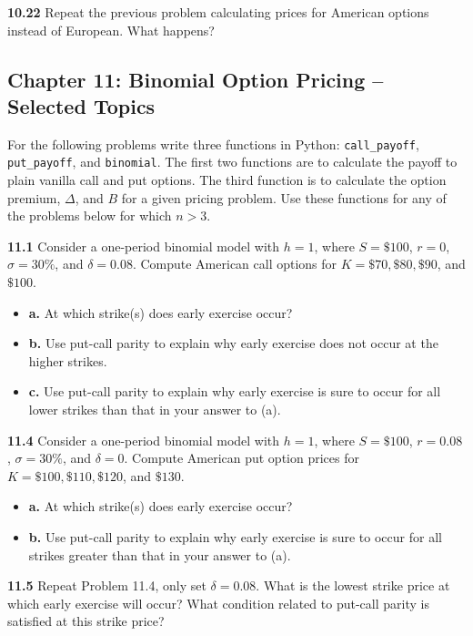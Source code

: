\documentclass[
  letterpaper,
  DIV=11,
  numbers=noendperiod]{scrartcl}
\begin{document}
\textbf{10.22} Repeat the previous problem calculating prices for
American options instead of European. What happens?

\subsection{Chapter 11: Binomial Option Pricing -- Selected
Topics}\label{chapter-11-binomial-option-pricing-selected-topics}

For the following problems write three functions in Python:
\texttt{call\_payoff}, \texttt{put\_payoff}, and \texttt{binomial}. The
first two functions are to calculate the payoff to plain vanilla call
and put options. The third function is to calculate the option premium,
\(\Delta\), and \(B\) for a given pricing problem. Use these functions
for any of the problems below for which \(n \gt 3\).

\textbf{11.1} Consider a one-period binomial model with \(h = 1\), where
\(S = \$100\), \(r = 0\), \(\sigma = 30\%\), and \(\delta = 0.08\).
Compute American call options for \(K = \$70, \$80, \$90\), and
\(\$100\).

\begin{itemize}
\item
  \textbf{a.} At which strike(s) does early exercise occur?
\item
  \textbf{b.} Use put-call parity to explain why early exercise does not
  occur at the higher strikes.
\item
  \textbf{c.} Use put-call parity to explain why early exercise is sure
  to occur for all lower strikes than that in your answer to (a).
\end{itemize}

\textbf{11.4} Consider a one-period binomial model with \(h = 1\), where
\(S = \$100\), \(r = 0.08\), \(\sigma = 30\%\), and \(\delta = 0\).
Compute American put option prices for \(K = \$100, \$110, \$120\), and
\(\$130\).

\begin{itemize}
\item
  \textbf{a.} At which strike(s) does early exercise occur?
\item
  \textbf{b.} Use put-call parity to explain why early exercise is sure
  to occur for all strikes greater than that in your answer to (a).
\end{itemize}

\textbf{11.5} Repeat Problem 11.4, only set \(\delta = 0.08\). What is
the lowest strike price at which early exercise will occur? What
condition related to put-call parity is satisfied at this strike price?
\end{document}

